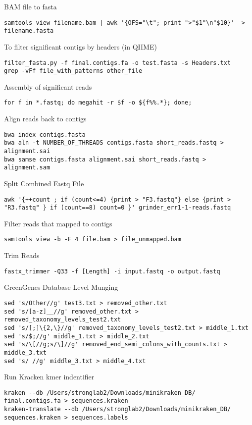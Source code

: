 \documentclass[idxtotoc,hyperref,openany,oneside]{labbook} %
\begin{document}
BAM file to fasta
\begin{verbatim}
samtools view filename.bam | awk '{OFS="\t"; print ">"$1"\n"$10}'  > filename.fasta
\end{verbatim}

To filter significant contigs by headers (in QIIME)
\begin{verbatim}
filter_fasta.py -f final.contigs.fa -o test.fasta -s Headers.txt 
grep -vFf file_with_patterns other_file
\end{verbatim}

Assembly of significant reads
\begin{verbatim}
for f in *.fastq; do megahit -r $f -o ${f%%.*}; done;
\end{verbatim}

Align reads back to contigs
\begin{verbatim}
bwa index contigs.fasta
bwa aln -t NUMBER_OF_THREADS contigs.fasta short_reads.fastq > alignment.sai
bwa samse contigs.fasta alignment.sai short_reads.fastq > alignment.sam
\end{verbatim}


Split Combined Fastq File
\begin{verbatim}
awk '{++count ; if (count<=4) {print > "F3.fastq"} else {print > "R3.fastq" } if (count==8) count=0 }' grinder_err1-1-reads.fastq
\end{verbatim} 

Filter reads that mapped to contigs
\begin{verbatim}
samtools view -b -F 4 file.bam > file_unmapped.bam
\end{verbatim}

Trim Reads
\begin{verbatim}
fastx_trimmer -Q33 -f [Length] -i input.fastq -o output.fastq
\end{verbatim}

GreenGenes Database Level Munging
\begin{verbatim}
sed 's/Other//g' test3.txt > removed_other.txt
sed 's/[a-z]__//g' removed_other.txt > removed_taxonomy_levels_test2.txt 
sed 's/[;]\{2,\}//g' removed_taxonomy_levels_test2.txt > middle_1.txt
sed 's/$;//g' middle_1.txt > middle_2.txt
sed 's/\[//g;s/\]//g' removed_end_semi_colons_with_counts.txt > middle_3.txt 
sed 's/ //g' middle_3.txt > middle_4.txt
\end{verbatim}


Run Kracken kmer indentifier
\begin{verbatim}
kraken --db /Users/stronglab2/Downloads/minikraken_DB/ final.contigs.fa > sequences.kraken
kraken-translate --db /Users/stronglab2/Downloads/minikraken_DB/ sequences.kraken > sequences.labels
\end{verbatim}
\end{document}
